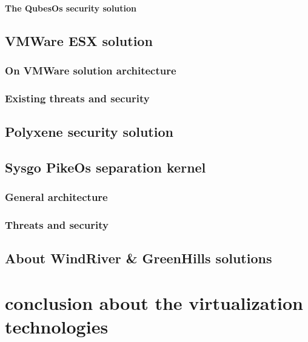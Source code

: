 
\paragraph{The QubesOs security solution}

\subsection{VMWare ESX solution}

\subsubsection{On VMWare solution architecture}

\subsubsection{Existing threats and security}

\subsection{Polyxene security solution}

\subsection{Sysgo PikeOs separation kernel}

\subsubsection{General architecture}

\subsubsection{Threats and security}

\subsection{About WindRiver \& GreenHills solutions}

\section{conclusion about the virtualization technologies}
